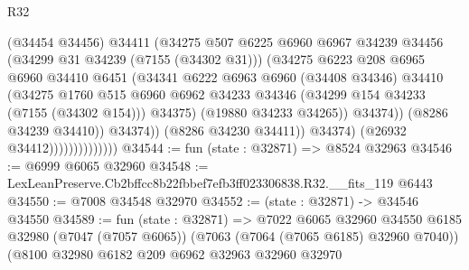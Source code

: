\begin{lexlean}{R32}
\begin{coremodule}
                                        (@34454 @34456)
                                        @34411
                                        (@34275
                                          @507
                                          @6225
                                          @6960
                                          @6967
                                          @34239
                                          @34456
                                          (@34299 @31 @34239 (@7155 (@34302 @31)))
                                          (@34275
                                            @6223
                                            @208
                                            @6965
                                            @6960
                                            @34410
                                            @6451
                                            (@34341
                                              @6222
                                              @6963
                                              @6960
                                              (@34408 @34346)
                                              @34410
                                              (@34275
                                                @1760
                                                @515
                                                @6960
                                                @6962
                                                @34233
                                                @34346
                                                (@34299 @154 @34233 (@7155 (@34302 @154)))
                                                @34375)
                                              (@19880 @34233 @34265))
                                            @34374))
                                        (@8286 @34239 @34410))
                                      @34374))
                                  (@8286 @34230 @34411))
                                @34374)
                              (@26932 @34412))))))))))))))
@34544 := fun (state : @32871) => @8524 @32963
@34546 := @6999 @6065 @32960
@34548 := LexLeanPreserve.Cb2bffcc8b22fbbef7efb3ff023306838.R32.__fits_119 @6443
@34550 := @7008 @34548 @32970
@34552 := (state : @32871) -> @34546 @34550
@34589 := fun (state : @32871) =>
  @7022
    @6065
    @32960
    @34550
    @6185
    @32980
    (@7047 (@7057 @6065))
    (@7063 (@7064 (@7065 @6185) @32960 @7040))
    (@8100
      @32980
      @6182
      @209
      @6962
      @32963
      @32960
      @32970

\end{coremodule}
\end{lexlean}

